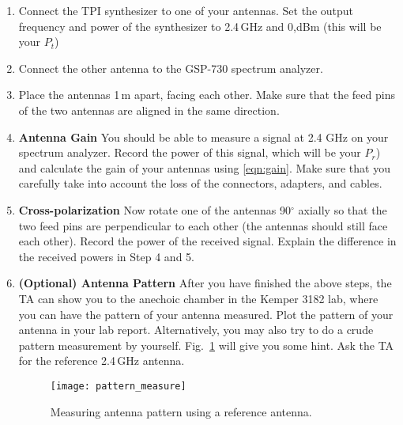 \documentclass[letterpaper, 11pt]{article}
\begin{document}
\begin{enumerate}
	\item Connect the TPI synthesizer to one of your antennas. Set the output frequency and power of the synthesizer to 2.4\,GHz and 0,dBm (this will be your $P_t$)
		
	\item Connect the other antenna to the GSP-730 spectrum analyzer. 
	
	\item Place the antennas 1\,m apart, facing each other. Make sure that the feed pins of the two antennas are aligned in the same direction. 
	
	\item \textbf{Antenna Gain}	You should be able to measure a signal at 2.4 GHz on your spectrum analyzer. Record the power of this signal, which will be your $P_r$) and calculate the gain of your antennas using \eqref{eqn:gain}. Make sure that you carefully take into account the loss of the connectors, adapters, and cables. 
	
	\item \textbf{Cross-polarization} Now rotate one of the antennas 90$^\circ$ axially so that the two feed pins are perpendicular to each other  (the antennas should still face each other). Record the power of the received signal. Explain the difference in the received powers in Step 4 and 5. 
	
	\item \textbf{(Optional) Antenna Pattern } After you have finished the above steps, the TA can show you to the anechoic chamber in the Kemper 3182 lab, where you can have the pattern of your antenna measured. Plot the pattern of your antenna in your lab report. Alternatively, you may also try to do a crude pattern measurement by yourself. Fig.~\ref{fig:pattern_measure} will give you some hint. Ask the TA for the reference 2.4\,GHz antenna. 
		\begin{figure}[ht]
			\centering	
			\texttt{[image: pattern\_measure]}
			\caption{Measuring antenna pattern using a reference antenna.}
			\label{fig:pattern_measure}
		\end{figure}
\end{enumerate}
%
% 
%
%
%
\end{document}
